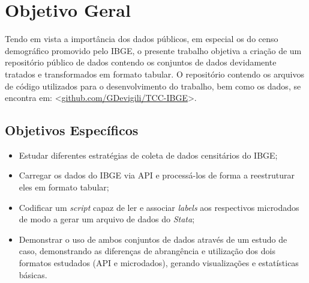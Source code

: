 


\chapter{Objetivo Geral}

    Tendo em vista a importância dos dados públicos, em especial os do censo demográfico promovido pelo IBGE, o presente trabalho objetiva a criação de um repositório público de dados contendo os conjuntos de dados devidamente tratados e transformados em formato tabular. O repositório contendo os arquivos de código utilizados para o desenvolvimento do trabalho, bem como os dados, se encontra em: <\url{github.com/GDevigili/TCC-IBGE}>.


\section{Objetivos Específicos}

\begin{itemize}
    \item Estudar diferentes estratégias de coleta de dados censitários do IBGE;
    \item Carregar os dados do IBGE via API e processá-los de forma a reestruturar eles em formato tabular;
    \item Codificar um \textit{script} capaz de ler e associar \textit{labels} aos respectivos microdados de modo a gerar um arquivo de dados do \textit{Stata};
    \item Demonstrar o uso de ambos conjuntos de dados através de um estudo de caso, demonstrando as diferenças de abrangência e utilização dos dois formatos estudados (API e microdados), gerando visualizações e estatísticas básicas.
\end{itemize}